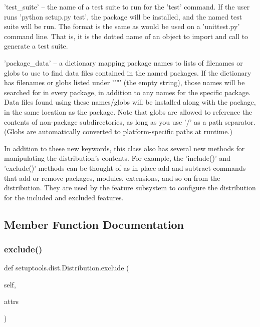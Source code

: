 \begin{DoxyVerb}
 'test_suite' -- the name of a test suite to run for the 'test' command.
    If the user runs 'python setup.py test', the package will be installed,
    and the named test suite will be run.  The format is the same as
    would be used on a 'unittest.py' command line.  That is, it is the
    dotted name of an object to import and call to generate a test suite.

 'package_data' -- a dictionary mapping package names to lists of filenames
    or globs to use to find data files contained in the named packages.
    If the dictionary has filenames or globs listed under '""' (the empty
    string), those names will be searched for in every package, in addition
    to any names for the specific package.  Data files found using these
    names/globs will be installed along with the package, in the same
    location as the package.  Note that globs are allowed to reference
    the contents of non-package subdirectories, as long as you use '/' as
    a path separator.  (Globs are automatically converted to
    platform-specific paths at runtime.)

In addition to these new keywords, this class also has several new methods
for manipulating the distribution's contents.  For example, the 'include()'
and 'exclude()' methods can be thought of as in-place add and subtract
commands that add or remove packages, modules, extensions, and so on from
the distribution.  They are used by the feature subsystem to configure the
distribution for the included and excluded features.
\end{DoxyVerb}
 

\subsection{Member Function Documentation}
\mbox{\label{classsetuptools_1_1dist_1_1_distribution_a5245d1b73f3cb0241bb7cef9644e9747}} 
\subsubsection{\texorpdfstring{exclude()}{exclude()}}
{\footnotesize\ttfamily def setuptools.\+dist.\+Distribution.\+exclude (\begin{DoxyParamCaption}\item[{}]{self,  }\item[{}]{attrs }\end{DoxyParamCaption})}

